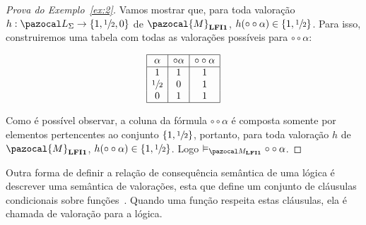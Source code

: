         \begin{proof}[Prova do Exemplo~\ref{ex:2}]
            Vamos mostrar que, para toda valoração $h : \ling{} \to \{1,\meio{},0\}$ de $\pazocal{M}_{\lfium{}}$, $h(\circ \circ \alpha) \in \{1, \sfrac{1}{2}{}\}$. Para isso, construiremos uma tabela com todas as valorações possíveis para $\circ \circ \alpha$:
            \begin{center}
                \[
                    \begin{array}{|c|c|c|}%
                        \hline
                        \alpha      & \circ \alpha & \circ \circ \alpha   \\
                        \hline%
                        1           & 1            &    1\\
                        \meio{    } & 0            &    1\\
                        0           & 1            &    1\\
                        \hline
                    \end{array}
                \]
            \end{center}

            Como é possível observar, a coluna da fórmula $\circ \circ \alpha$ é composta somente por elementos pertencentes ao conjunto $\{1, \sfrac{1}{2}{}\}$, portanto, para toda valoração $h$ de $\pazocal{M}_{\lfium{}}$, $h(\circ \circ \alpha) \in \{1, \sfrac{1}{2}{}\}$. Logo $ \conmat \circ \circ \alpha$.
            
        \end{proof}

        
        Outra forma de definir a relação de consequência semântica de uma lógica é descrever uma semântica de valorações, esta que define um conjunto de cláusulas condicionais sobre funções~\cite{DaCosta1977-NEWASA-3}. Quando uma função respeita estas cláusulas, ela é chamada de valoração para a lógica.

